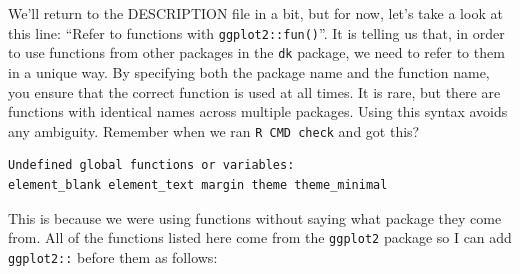 \documentclass[
]{book}
\begin{document}
We'll return to the DESCRIPTION file in a bit, but for now, let's take a look at this line: ``Refer to functions with \texttt{ggplot2::fun()}''. It is telling us that, in order to use functions from other packages in the \texttt{dk} package, we need to refer to them in a unique way. By specifying both the package name and the function name, you ensure that the correct function is used at all times. It is rare, but there are functions with identical names across multiple packages. Using this syntax avoids any ambiguity. Remember when we ran \texttt{R\ CMD\ check} and got this?

\begin{verbatim}
Undefined global functions or variables:
element_blank element_text margin theme theme_minimal
\end{verbatim}

This is because we were using functions without saying what package they come from. All of the functions listed here come from the \texttt{ggplot2} package so I can add \texttt{ggplot2::} before them as follows:
\end{document}
